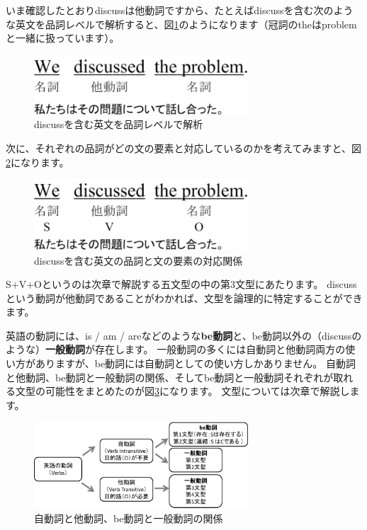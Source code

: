 \documentclass[titlepage]{jsarticle}
\begin{document}
いま確認したとおりdiscussは他動詞ですから、たとえばdiscussを含む次のような英文を品詞レベルで解析すると、図\ref{fig9}のようになります（冠詞のtheはproblemと一緒に扱っています）。
  \begin{figure}[htbp]
   \begin{center}
    \includegraphics[width=8cm]{./figure/fig9.pdf}
    \caption{discussを含む英文を品詞レベルで解析}
    \label{fig9}
   \end{center}
  \end{figure}

  次に、それぞれの品詞がどの文の要素と対応しているのかを考えてみますと、図\ref{fig10}になります。
  \begin{figure}[htbp]
   \begin{center}
    \includegraphics[width=8cm]{./figure/fig10.pdf}
    \caption{discussを含む英文の品詞と文の要素の対応関係}
    \label{fig10}
   \end{center}
  \end{figure}

  S+V+Oというのは次章で解説する五文型の中の第3文型にあたります。
  discussという動詞が他動詞であることがわかれば、文型を論理的に特定することができます。

  英語の動詞には、is / am / areなどのような{\bf be動詞}と、be動詞以外の（discussのような）{\bf 一般動詞}が存在します。
  一般動詞の多くには自動詞と他動詞両方の使い方がありますが、be動詞には自動詞としての使い方しかありません。
  自動詞と他動詞、be動詞と一般動詞の関係、そしてbe動詞と一般動詞それぞれが取れる文型の可能性をまとめたのが図\ref{fig11}になります。
  文型については次章で解説します。
  \begin{figure}[htbp]
   \begin{center}
    \includegraphics[width=8cm]{./figure/fig11.pdf}
    \caption{自動詞と他動詞、be動詞と一般動詞の関係}
    \label{fig11}
   \end{center}
  \end{figure}
\end{document}
